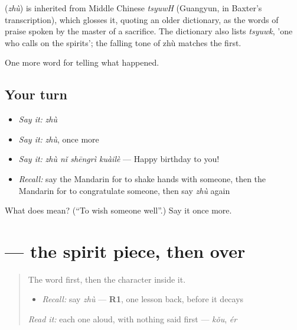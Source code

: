 \begin{cousinweb}
\textbf{} (\emph{zhù}) is inherited from Middle Chinese \emph{tsyuwH} (Guangyun, in Baxter's transcription), which glosses it, quoting an older dictionary, as the words of praise spoken by the master of a sacrifice. The dictionary also lists \emph{tsyuwk}, 'one who calls on the spirits'; the falling tone of zhù matches the first.
\end{cousinweb}

\begin{grammarlens}[title={What you've built}]
One more word for telling what happened.
\end{grammarlens}

\subsection*{Your turn}
\begin{itemize}
\raggedright
  \item \emph{Say it:} \emph{zhù}
  \item \emph{Say it:} \emph{zhù}, once more
  \item \emph{Say it:} \emph{zhù nǐ shēngrì kuàilè} — Happy birthday to you!
  \item \emph{Recall:} say the Mandarin for to shake hands with someone, then the Mandarin for to congratulate someone, then say \emph{zhù} again
\end{itemize}

\begin{tcolorbox}[breakable,colback=teal!4,colframe=teal!35!black,title={Before you move on}]
What does  mean? (\textquotedblleft{}To wish someone well\textquotedblright{}.) Say it once more.
\end{tcolorbox}
\section[\texorpdfstring{\zh{祝} (zhù)}{祝 (zhù)}]{ — the spirit piece, then  over }

\label{lesson:ZH-W337-zhu-wish}



\begin{quote}
The word first, then the character inside it.

\begin{itemize}
\raggedright
  \item \emph{Recall:} say \emph{zhù} — \textbf{R1}, one lesson back, before it decays
\end{itemize}

\begin{quote}
 
\end{quote}

\emph{Read it:} each one aloud, with nothing said first — \emph{kǒu}, \emph{ér}
\end{quote}

